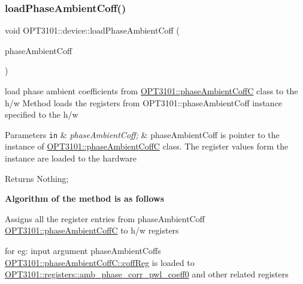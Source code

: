 \subsubsection{\texorpdfstring{load\+Phase\+Ambient\+Coff()}{loadPhaseAmbientCoff()}}
{\footnotesize\ttfamily void O\+P\+T3101\+::device\+::load\+Phase\+Ambient\+Coff (\begin{DoxyParamCaption}\item[{\mbox{\hyperlink{class_o_p_t3101_1_1phase_ambient_coff_c}{O\+P\+T3101\+::phase\+Ambient\+CoffC}} $\ast$}]{phase\+Ambient\+Coff }\end{DoxyParamCaption})}



load phase ambient coefficients from \mbox{\hyperlink{class_o_p_t3101_1_1phase_ambient_coff_c}{O\+P\+T3101\+::phase\+Ambient\+CoffC}} class to the h/w Method loads the registers from O\+P\+T3101\+::phase\+Ambient\+Coff instance specified to the h/w 


\begin{DoxyParams}[1]{Parameters}
\mbox{\tt in}  & {\em phase\+Ambient\+Coff;} & phase\+Ambient\+Coff is pointer to the instance of \mbox{\hyperlink{class_o_p_t3101_1_1phase_ambient_coff_c}{O\+P\+T3101\+::phase\+Ambient\+CoffC}} class. The register values form the instance are loaded to the hardware \\
\hline
\end{DoxyParams}
\begin{DoxyReturn}{Returns}
Nothing; 
\end{DoxyReturn}
{\bfseries Algorithm of the method is as follows}


\begin{DoxyItemize}
\item Assigns all the register entries from phase\+Ambient\+Coff \mbox{\hyperlink{class_o_p_t3101_1_1phase_ambient_coff_c}{O\+P\+T3101\+::phase\+Ambient\+CoffC}} to h/w registers ~\newline

\item for eg\+: input argument phase\+Ambient\+Coff\textquotesingle{}s \mbox{\hyperlink{class_o_p_t3101_1_1phase_ambient_coff_c_a267c8f925dedeb8af97aba7ffae95da4}{O\+P\+T3101\+::phase\+Ambient\+Coff\+C\+::coff\+Reg}} is loaded to \mbox{\hyperlink{class_o_p_t3101_1_1registers_a3a959d073208e7bc1859551052620c33}{O\+P\+T3101\+::registers\+::amb\+\_\+phase\+\_\+corr\+\_\+pwl\+\_\+coeff0}} and other related registers 
\end{DoxyItemize}\mbox{\label{class_o_p_t3101_1_1device_ac70129fa0dacd700b19349087f000f76}} 
